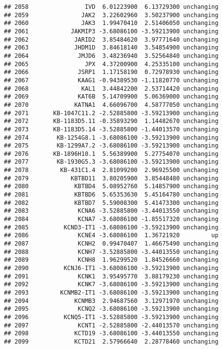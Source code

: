 \documentclass[]{article}
\begin{document}
\begin{verbatim}
## 2058                IVD  6.01223900  6.13729300 unchanging
## 2059               JAK2  3.22602960  3.50237900 unchanging
## 2060               JAK3  1.99470410  2.51406050 unchanging
## 2061            JAKMIP3 -3.68086100 -3.59213900 unchanging
## 2062             JARID2  3.85484620  3.97771640 unchanging
## 2063             JHDM1D  3.84618140  3.54854900 unchanging
## 2064              JMJD6  3.48236940  3.52564840 unchanging
## 2065                JPX  4.37200900  4.25335100 unchanging
## 2066              JSRP1  1.17158190  0.72978930 unchanging
## 2067              KAAG1 -0.94389530 -1.11820770 unchanging
## 2068               KAL1  3.44842200  2.53714420 unchanging
## 2069              KAT6B  5.14709900  5.06369000 unchanging
## 2070             KATNA1  4.66096700  4.58777050 unchanging
## 2071       KB-1047C11.2 -2.52885800 -3.59213900 unchanging
## 2072       KB-1183D5.11 -0.35893290  1.14482670 unchanging
## 2073       KB-1183D5.14 -3.52885800 -1.44013570 unchanging
## 2074        KB-1254G8.1 -3.68086100 -3.59213900 unchanging
## 2075        KB-1299A7.2 -3.68086100 -3.59213900 unchanging
## 2076       KB-1896H10.1  5.56389900  5.27754070 unchanging
## 2077        KB-1930G5.3 -3.68086100 -3.59213900 unchanging
## 2078         KB-431C1.4  2.81099200  2.96925500 unchanging
## 2079            KBTBD11  3.80205900  3.85448480 unchanging
## 2080             KBTBD4  5.08952760  5.14857900 unchanging
## 2081             KBTBD6  5.65353630  5.45164780 unchanging
## 2082             KBTBD7  5.59008300  5.41473300 unchanging
## 2083              KCNA6 -3.52885800 -3.44013550 unchanging
## 2084              KCNA7 -3.68086100 -1.85517320 unchanging
## 2085          KCND3-IT1 -3.68086100 -3.59213900 unchanging
## 2086              KCNE4 -3.68086100  1.36721920         up
## 2087              KCNH2  0.99470407  1.46675490 unchanging
## 2088              KCNH7 -3.52885800 -3.44013550 unchanging
## 2089              KCNH8  1.96299520  1.84526660 unchanging
## 2090          KCNJ6-IT1 -3.68086100 -3.59213900 unchanging
## 2091              KCNK1  3.95495770  3.88179230 unchanging
## 2092              KCNK7 -3.68086100 -3.59213900 unchanging
## 2093         KCNMB2-IT1 -3.68086100 -3.59213900 unchanging
## 2094             KCNMB3  2.94687560  3.12971970 unchanging
## 2095              KCNQ2 -3.68086100 -3.59213900 unchanging
## 2096          KCNQ5-IT1 -3.52885800 -3.59213900 unchanging
## 2097              KCNT1 -2.52885800 -2.44013570 unchanging
## 2098             KCTD19 -3.68086100 -3.44013550 unchanging
## 2099             KCTD21  2.57966640  2.28778460 unchanging

\end{verbatim}
\end{document}
